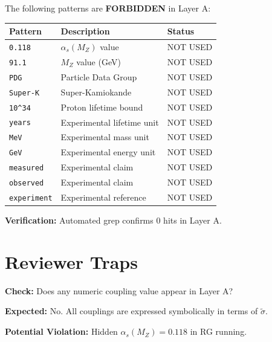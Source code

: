 \documentclass[11pt,a4paper]{article}
\theoremstyle{definition}
\begin{document}
\begin{forbiddenbox}
The following patterns are \textbf{FORBIDDEN} in Layer A:

\begin{center}
\begin{tabular}{lll}
\toprule
Pattern & Description & Status \\
\midrule
\texttt{0.118} & $\alpha_s(M_Z)$ value & NOT USED \\
\texttt{91.1} & $M_Z$ value (GeV) & NOT USED \\
\texttt{PDG} & Particle Data Group & NOT USED \\
\texttt{Super-K} & Super-Kamiokande & NOT USED \\
\texttt{10\^{}34} & Proton lifetime bound & NOT USED \\
\texttt{years} & Experimental lifetime unit & NOT USED \\
\texttt{MeV} & Experimental mass unit & NOT USED \\
\texttt{GeV} & Experimental energy unit & NOT USED \\
\texttt{measured} & Experimental claim & NOT USED \\
\texttt{observed} & Experimental claim & NOT USED \\
\texttt{experiment} & Experimental reference & NOT USED \\
\bottomrule
\end{tabular}
\end{center}

\textbf{Verification:} Automated grep confirms 0 hits in Layer A.
\end{forbiddenbox}

\section{Reviewer Traps}
\label{sec:reviewer-traps}

\begin{trapbox}
\textbf{Check:} Does any numeric coupling value appear in Layer A?

\textbf{Expected:} No. All couplings are expressed symbolically in terms of $\tilde{\sigma}$.

\textbf{Potential Violation:} Hidden $\alpha_s(M_Z) = 0.118$ in RG running.
\end{trapbox}
\end{document}
